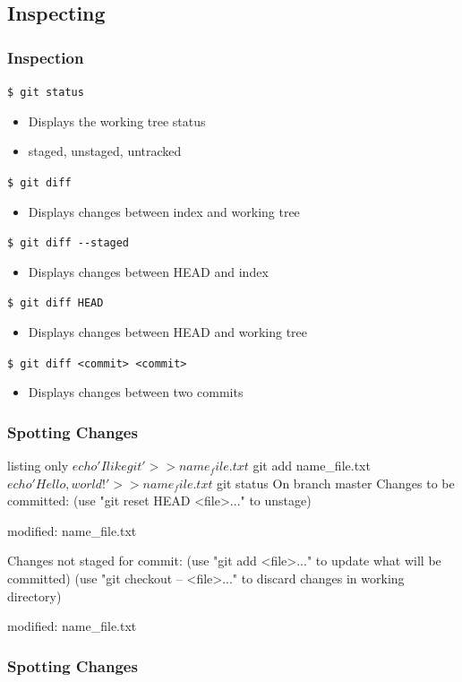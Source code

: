 \documentclass[english,compress]{beamer}
\begin{document}
\subsection{Inspecting}
\begin{frame}[fragile]
    \frametitle{Inspection}

    \verb|$ git status|
    \begin{itemize}
        \item Displays the working tree status
        \item staged, unstaged, untracked
    \end{itemize}
    \verb|$ git diff|
    \begin{itemize}
        \item Displays changes between index and working tree
    \end{itemize}
    \verb|$ git diff --staged|
    \begin{itemize}
        \item Displays changes between HEAD and index
    \end{itemize}
    \verb|$ git diff HEAD|
    \begin{itemize}
        \item Displays changes between HEAD and working tree
    \end{itemize}
    \verb|$ git diff <commit> <commit>|
    \begin{itemize}
        \item Displays changes between two commits
    \end{itemize}
\end{frame}

\begin{frame}[fragile]
    \frametitle{Spotting Changes}
    \begin{tcblisting}{listing only}
$ echo 'I like git' >> name_file.txt
$ git add name_file.txt 
$ echo 'Hello, world!' >> name_file.txt
$ git status
On branch master
Changes to be committed:
  (use "git reset HEAD <file>..." to unstage)

	modified:   name_file.txt

Changes not staged for commit:
  (use "git add <file>..." to update what will be committed)
  (use "git checkout -- <file>..." to discard changes in working directory)

	modified:   name_file.txt
    \end{tcblisting}
\end{frame}

\begin{frame}[fragile]
    \frametitle{Spotting Changes}
\end{frame}
\end{document}
